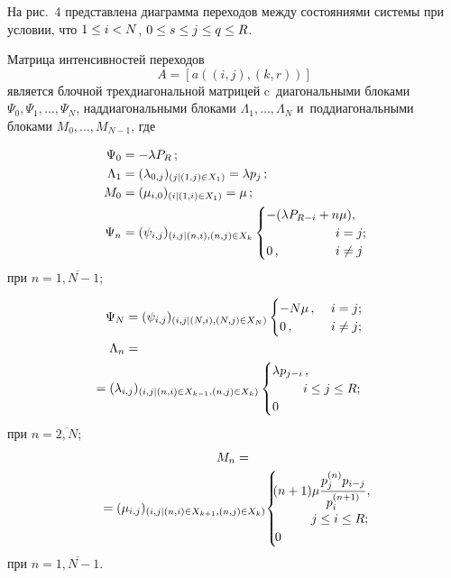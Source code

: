 \begin{multicols}{2}
  На рис.~4 представлена диаграмма переходов между состояниями системы 
при условии, что $1\hm\leq i\hm< N$, $0\hm\leq s\hm\leq j\hm\leq q\hm\leq R$.
  
 
  
  Матрица интенсивностей переходов 
  $$
  A= [a((i,j),(k,r))]
  $$
   является блочной 
трехдиагональной матрицей c~диагональными блоками $\Psi_0, \Psi_1, \ldots , 
\Psi_N$, наддиагональными блоками $\Lambda_1,\ldots, \Lambda_N$ 
и~поддиагональными блоками ${M}_0, \ldots , {M}_{N-1}$, где

\noindent
  \begin{align}
  \Psi_0 &= -\lambda P_R\,;\label{e2-v}\\
  \Lambda_1 &= (\lambda_{0,j})_{(j\vert(1,j)\in X_1)} = \lambda p_j\,; 
\label{e3-v}\\
  {M}_0 &= (\mu_{i,0})_{(i\vert (1,i)\in X_1)} = \mu\,;\label{e4-v}\\
  \Psi_n &= (\psi_{i,j})_{(i,j\vert(n,i),(n,j)\in X_k}
  \begin{cases} -(\lambda P_{R-i} +n\mu), &\\
  &\hspace*{-9mm}i=j;\\
  0\,, &\hspace*{-9mm}i\not=j
  \end{cases}\!\!
  \label{e5-v}
  \end{align}
при $n=\overline{1,N-1}$;
\pagebreak

\noindent
\begin{align}
\Psi_N&= (\psi_{i,j})_{(i,j\vert(N,i),(N,j)\in X_N)}\begin{cases}
-N\mu\,, &\ i=j;\\
0\,, &\ i\not=j;
\end{cases}
\label{e6-v}\\
\Lambda_n &= {}\notag\\
&\hspace*{-9mm}{}=(\lambda_{i,j})_{(i,j\vert(n,i)\in X_{k-1},(n,j)\in X_k)} 
\begin{cases}
\lambda p_{j-i}\,, &\\
&\hspace*{-5mm} i\leq j\leq R;\\
0 &
\end{cases}
\end{align}
при $n=\overline{2,N}$;
\begin{multline}
{M}_n ={}\\
\hspace*{-1mm}{}= (\mu_{i,j})_{(i,j\vert(n,i)\in X_{k+1},(n,j)\in X_k)}\!
\begin{cases}\!
\!(n+1)\mu\fr{p_j^{(n)} p_{i-j}}{p_i^{(n+1)}}, &\\
&\hspace*{-20mm} j\leq i\leq R;\\
\!0 &
\end{cases}\!\!\!\!\!\!\!\!\!
\label{e8-v}
\end{multline}
при $n=\overline{1,N-1}$.


\end{multicols}
